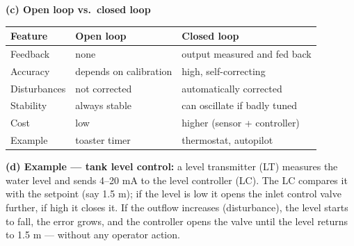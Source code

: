 \documentclass[11pt,a4paper]{article}
\begin{document}
\begin{enumerate}
\begin{answer}
			\textbf{(c) Open loop vs.\ closed loop}
			\begin{center}
				\small
				\begin{tabular}{@{}p{3.2cm}p{5.4cm}p{5.4cm}@{}}
					\toprule
					\textbf{Feature} & \textbf{Open loop} & \textbf{Closed loop} \\
					\midrule
					Feedback     & none                    & output measured and fed back \\
					Accuracy     & depends on calibration  & high, self-correcting \\
					Disturbances & not corrected           & automatically corrected \\
					Stability    & always stable           & can oscillate if badly tuned \\
					Cost         & low                     & higher (sensor + controller) \\
					Example      & toaster timer           & thermostat, autopilot \\
					\bottomrule
				\end{tabular}
			\end{center}

			\textbf{(d) Example --- tank level control:} a level transmitter (LT) measures the water level and sends 4--20 mA to the level controller (LC). The LC compares it with the setpoint (say 1.5 m); if the level is low it opens the inlet control valve further, if high it closes it. If the outflow increases (disturbance), the level starts to fall, the error grows, and the controller opens the valve until the level returns to 1.5 m --- without any operator action.
		\end{answer}


\end{enumerate}
\end{document}

